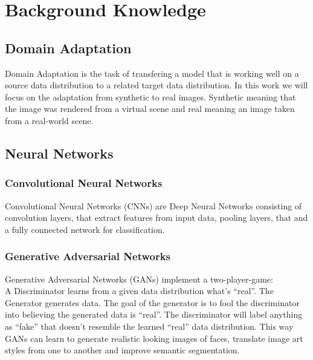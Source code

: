 \chapter{Background Knowledge}

\section{Domain Adaptation}
Domain Adaptation is the task of transfering a model that is working well on a source data distribution to a related target data distribution. In this work we will focus on the adaptation from synthetic to real images. Synthetic meaning that the image was rendered from a virtual scene and real meaning an image taken from a real-world scene. 


\section{Neural Networks}

\subsection{Convolutional Neural Networks}
Convolutional Neural Networks (CNNs) are Deep Neural Networks consisting of convolution layers, that extract features from input data, pooling layers, that  and a fully connected network for classification. 


\subsection{Generative Adversarial Networks}
Generative Adversarial Networks (GANs) implement a two-player-game:\\
A Discriminator learns from a given data distribution what's ``real''. The Generator generates data. The goal of the generator is to fool the discriminator into believing the generated data is ``real''. The discriminator will label anything as ``fake'' that doesn't resemble the learned ``real'' data distribution. This way GANs can learn to generate realistic looking images of faces, translate image art styles from one to another and improve semantic segmentation.


